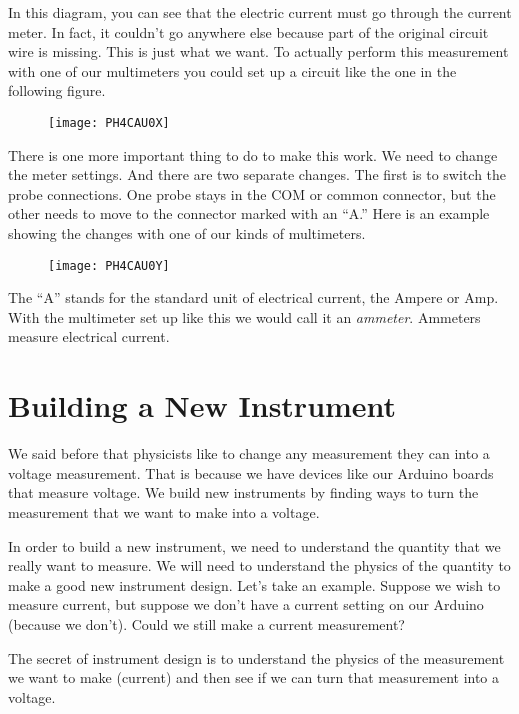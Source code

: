 In this diagram, you can see that the electric current must go through the current meter. In fact, it couldn't go anywhere else because part of the original circuit wire is missing. This is just what we want. To actually perform this measurement with one of our multimeters you could set up a circuit like the one in the following figure. 

\begin{figure}[h!]
	\centering
    \texttt{[image: PH4CAU0X]}
\end{figure}

There is one more important thing to do to make this work. We need to change the meter settings. And there are two separate changes. The first is to switch the probe connections. One probe stays in the COM or common connector, but the other needs to move to the connector marked with an ``A.'' Here is an example showing the changes with one of our kinds of multimeters. 

\begin{figure}[h!]
    \centering
    \texttt{[image: PH4CAU0Y]}
\end{figure}

The ``A'' stands for the standard unit of electrical current, the Ampere or Amp. With the multimeter set up like this we would call it an \emph{ammeter}. Ammeters measure electrical current.

\section{Building a New Instrument} \label{New_Instrument_Section}

We said before that physicists like to change any measurement they can into a voltage measurement. That is because we have devices like our Arduino boards that measure voltage. We build new instruments by finding ways to turn the measurement that we want to make into a voltage.

In order to build a new instrument, we need to understand the quantity that we really want to measure. We will need to understand the physics of the quantity to make a good new instrument design. Let's take an example. Suppose we wish to measure current, but suppose we don't have a current setting on our Arduino (because we don't). Could we still make a current measurement?

The secret of instrument design is to understand the physics of the measurement we want to make (current) and then see if we can turn that measurement into a voltage.

